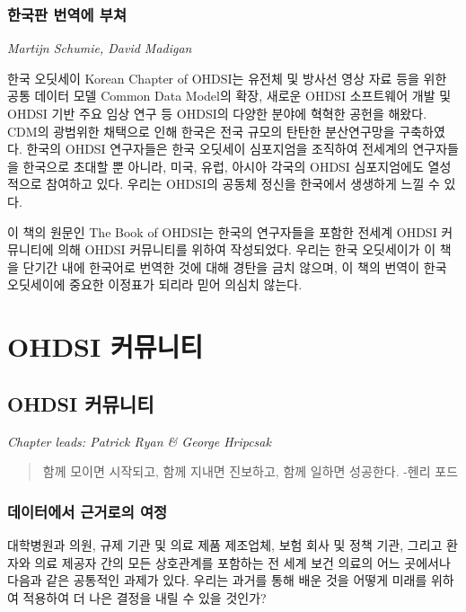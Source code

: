\documentclass[10.5pt]{book}
\theoremstyle{definition}
\theoremstyle{definition}
\theoremstyle{definition}
\theoremstyle{remark}
\begin{document}
\section*{한국판 번역에 부쳐}\label{--}

\emph{Martijn Schumie, David Madigan}

한국 오딧세이 Korean Chapter of OHDSI는 유전체 및 방사선 영상 자료 등을
위한 공통 데이터 모델 Common Data Model의 확장, 새로운 OHDSI 소프트웨어
개발 및 OHDSI 기반 주요 임상 연구 등 OHDSI의 다양한 분야에 혁혁한 공헌을
해왔다. CDM의 광범위한 채택으로 인해 한국은 전국 규모의 탄탄한
분산연구망을 구축하였다. 한국의 OHDSI 연구자들은 한국 오딧세이
심포지엄을 조직하여 전세계의 연구자들을 한국으로 초대할 뿐 아니라, 미국,
유럽, 아시아 각국의 OHDSI 심포지엄에도 열성적으로 참여하고 있다. 우리는
OHDSI의 공동체 정신을 한국에서 생생하게 느낄 수 있다.

이 책의 원문인 The Book of OHDSI는 한국의 연구자들을 포함한 전세계 OHDSI
커뮤니티에 의해 OHDSI 커뮤니티를 위하여 작성되었다. 우리는 한국
오딧세이가 이 책을 단기간 내에 한국어로 번역한 것에 대해 경탄을 금치
않으며, 이 책의 번역이 한국 오딧세이에 중요한 이정표가 되리라 믿어
의심치 않는다.

\mainmatter

\part{OHDSI 커뮤니티}\label{part-ohdsi-}

\chapter{OHDSI 커뮤니티}\label{OhdsiCommunity}

\emph{Chapter leads: Patrick Ryan \& George Hripcsak}

\begin{quote}
함께 모이면 시작되고, 함께 지내면 진보하고, 함께 일하면 성공한다. -헨리
포드
\end{quote}

\section{데이터에서 근거로의 여정}\label{--}

대학병원과 의원, 규제 기관 및 의료 제품 제조업체, 보험 회사 및 정책
기관, 그리고 환자와 의료 제공자 간의 모든 상호관계를 포함하는 전 세계
보건 의료의 어느 곳에서나 다음과 같은 공통적인 과제가 있다. 우리는
과거를 통해 배운 것을 어떻게 미래를 위하여 적용하여 더 나은 결정을 내릴
수 있을 것인가?
\end{document}
